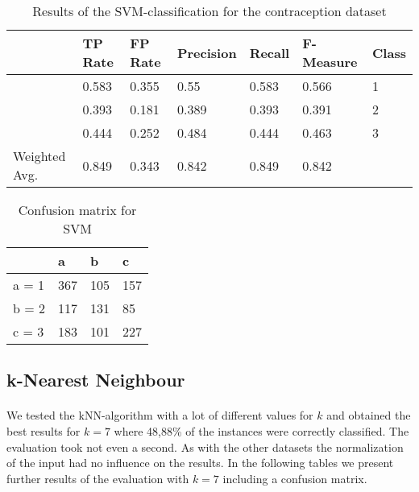 \documentclass[paper=a4, fontsize=11pt]{scrartcl} %
\numberwithin{equation}{section} %
\numberwithin{figure}{section} %
\numberwithin{table}{section} %
\begin{document}
\begin{table}[htb]
\centering
\begin{tabular}{lllllll}
	\toprule
	&								TP Rate   	&FP Rate   &Precision   &Recall  &F-Measure     	&Class\\ 
	\midrule
									&0.583     	&0.355     &0.55      	&0.583   &0.566   		    	&1\\
                 	&0.393     	&0.181     &0.389     	&0.393   &0.391      	    	&2\\
                 	&0.444     	&0.252     &0.484     	&0.444   &0.463      	    	&3\\
	Weighted Avg.   & 0.849    & 0.343      &0.842   &  0.849     &0.842     			&\\
	\bottomrule
\end{tabular}
\caption{Results of the SVM-classification for the contraception dataset}
\end{table}

\vspace{6pt}

\begin{table}[h]
\centering
\begin{tabular}{|l|lll|}
	\hline
	      &a   &b   &c \\
	\hline
	a = 1 &367 &105 &157 \\
 	b = 2 &117 &131 &85 \\
 	c = 3 &183 &101 &227 \\
  \hline
\end{tabular}
\caption{Confusion matrix for SVM}
\end{table}


\subsection{k-Nearest Neighbour}

\paragraph{}We tested the kNN-algorithm with a lot of different values for $k$ and obtained the best results for $k=7$ where 48,88\% of the instances were correctly classified. The evaluation took not even a second. As with the other datasets the normalization of the input had no influence on the results. In the following tables we present further results of the evaluation with $k=7$ including a confusion matrix.
\end{document}
